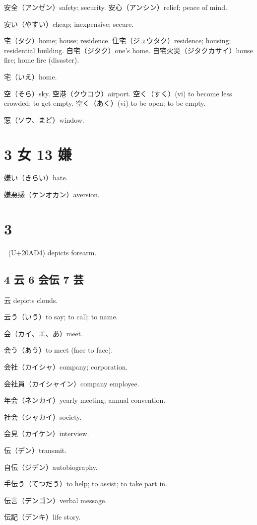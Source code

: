安全（アンゼン）safety; security.
安心（アンシン）relief; peace of mind.

安い（やすい）cheap; inexpensive; secure.

宅（タク）home; house; residence.
住宅（ジュウタク）residence; housing; residential building.
自宅（ジタク）one's home.
自宅火災（ジタクカサイ）house fire; home fire (disaster).

宅（いえ）home.

空（そら）sky.
空港（クウコウ）airport.
空く（すく）(vi) to become less crowded; to get empty.
空く（あく）(vi) to be open; to be empty.

窓（ソウ、まど）window.

\section{3 女 13 嫌}

嫌い（きらい）hate.

嫌悪感（ケンオカン）aversion.

\section{3 𠫔}

𠫔 (U+20AD4) depicts forearm.

\subsection{4 云 6 会伝 7 芸}

云 depicts clouds.

云う（いう）to say; to call; to name.

会（カイ、エ、あ）meet.

会う（あう）to meet (face to face).

会社（カイシャ）company; corporation.

会社員（カイシャイン）company employee.

年会（ネンカイ）yearly meeting; annual convention.

社会（シャカイ）society.

会見（カイケン）interview.

伝（デン）transmit.

自伝（ジデン）autobiography.

手伝う（てつだう）to help; to assist; to take part in.

伝言（デンゴン）verbal message.

伝記（デンキ）life story.

